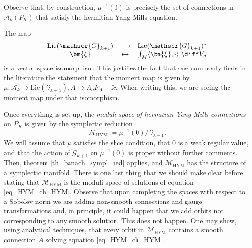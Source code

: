 Observe that, by construction, \(\mu^{-1}(0)\) is precisely the set of connections in \(\mathscr{A}_k(P_K)\) that satisfy the hermitian Yang-Mills equation.
\begin{obs} \label{obs_mu_lie_sin_dual}
    The map 
    \[
    \begin{array}{ccc}
        \mathrm{Lie}(\mathscr{G}_{k+1}) & \longrightarrow & \mathrm{Lie}(\mathscr{G}_{k+1})^* \\
        \bm{\xi} & \mapsto & \int_M \langle \bm{\xi}, \cdot \rangle \ \diff V_g
    \end{array}
    \]
    is a vector space isomorphism. This justifies the fact that one commonly finds in the literature the statement that the moment map is given by \(\mu \colon \mathscr{A}_{k} \to \mathrm{Lie}(\mathscr{G}_{k+1}), A \mapsto \Lambda_\omega F_A+\ii c\). When writing this, we are seeing the moment map under that isomorphism.
\end{obs}

Once everything is set up, the \textit{moduli space of hermitian Yang-Mills connections} on \(P_K\) is given by the symplectic reduction 
\[
\mathcal{M}_{\mathrm{HYM}}:=\mu^{-1}(0)/\mathscr{G}_{k+1}.
\]
We will assume that \(\mu\) satisfies the slice condition, that \(0\) is a weak regular value, and that the action of \(\mathscr{G}_{k+1}\) on \(\mu^{-1}(0)\) is proper without further comments. Then, theorem \ref{th_banach_sympl_red} applies, and \(\mathcal{M}_{\mathrm{HYM}}\) has the structure of a symplectic manifold. There is one last thing that we should make clear before stating that \(\mathcal{M}_{\mathrm{HYM}}\) is the moduli space of solutions of equation \eqref{eq_HYM_ch_HYM}. Observe that upon completing the spaces with respect to a Sobolev norm we are adding non-smooth connections and gauge transformations and, in principle, it could happen that we add orbits not corresponding to any smooth solution. This does not happen. One may show, using analytical techniques, that every orbit in \(\mathcal{M}_{\mathrm{HYM}}\) contains a smooth connection \(A\) solving equation \eqref{eq_HYM_ch_HYM}.

